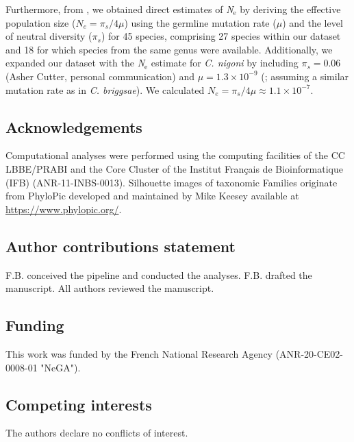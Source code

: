 Furthermore, from \citet{lynch_divergence_2023}, we obtained direct estimates of \textit{N}$_{\text{e}}$ by deriving the effective population size ($N_{e}=\pi_{s}/4\mu$) using the germline mutation rate ($\mu$) and the level of neutral diversity ($\pi_s$) for 45 species, comprising 27 species within our dataset and 18 for which species from the same genus were available. Additionally, we expanded our dataset with the \textit{N}$_{\text{e}}$ estimate for \textit{C. nigoni} by including $\pi_s=0.06$ (Asher Cutter, personal communication) and $\mu=1.3\times10^{-9}$ (\citet{denver_variation_2012}; assuming a similar mutation rate as in \textit{C. briggsae}). We calculated $N_{e}=\pi_s/4\mu\approx 1.1\times 10^{-7}$.

\subsection*{Acknowledgements}
Computational analyses were performed using the computing facilities of the CC LBBE/PRABI and the Core Cluster of the Institut Français de Bioinformatique (IFB) (ANR-11-INBS-0013).
Silhouette images of taxonomic Families originate from PhyloPic developed and maintained by Mike Keesey available at \url{https://www.phylopic.org/}.

\subsection*{Author contributions statement}
F.B. conceived the pipeline and conducted the analyses. F.B. drafted the manuscript. All authors reviewed the manuscript. 

\subsection*{Funding}
This work was funded by the French National Research Agency (ANR-20-CE02-0008-01 "NeGA").

\subsection*{Competing interests}
The authors declare no conflicts of interest.
